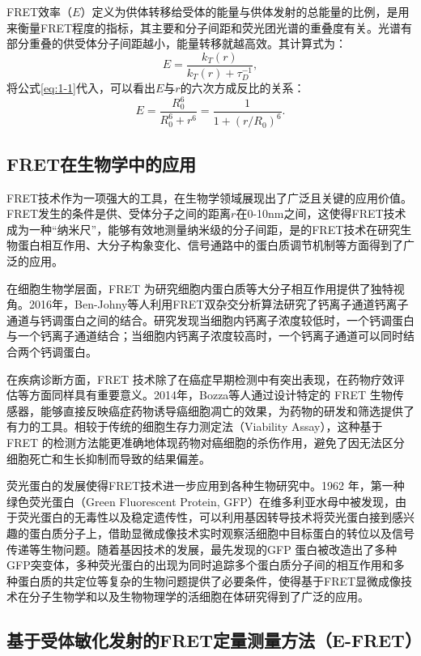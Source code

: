 FRET效率（$E$）定义为供体转移给受体的能量与供体发射的总能量的比例，是用来衡量FRET程度的指标，其主要和分子间距和荧光团光谱的重叠度有关。光谱有部分重叠的供受体分子间距越小，能量转移就越高效。其计算式为：
\begin{equation}
    {E}=\frac{k_T(r)}{k_T(r)+\tau^{-1}_{D}},
\end{equation}
将公式\ref{eq:1-1}代入，可以看出$E$与$r$的六次方成反比的关系：
\begin{equation}
    E=\frac{R_0^6}{R_0^6+r^6}=\frac{1}{1+(r/R_0)^6}.
\end{equation}
\fi


\subsection{FRET在生物学中的应用}

\ifshowtext
FRET技术作为一项强大的工具，在生物学领域展现出了广泛且关键的应用价值。FRET发生的条件是供、受体分子之间的距离$r$在0-10nm之间，这使得FRET技术成为一种“纳米尺”，能够有效地测量纳米级的分子间距，是的FRET技术在研究生物蛋白相互作用、大分子构象变化、信号通路中的蛋白质调节机制等方面得到了广泛的应用。

在细胞生物学层面，FRET 为研究细胞内蛋白质等大分子相互作用提供了独特视角。2016年，Ben-Johny等人利用FRET双杂交分析算法研究了钙离子通道钙离子通道与钙调蛋白之间的结合。研究发现当细胞内钙离子浓度较低时，一个钙调蛋白与一个钙离子通道结合；当细胞内钙离子浓度较高时，一个钙离子通道可以同时结合两个钙调蛋白。

在疾病诊断方面，FRET 技术除了在癌症早期检测中有突出表现，在药物疗效评估等方面同样具有重要意义。2014年，Bozza等人通过设计特定的 FRET 生物传感器，能够直接反映癌症药物诱导癌细胞凋亡的效果，为药物的研发和筛选提供了有力的工具。相较于传统的细胞生存力测定法（Viability Assay），这种基于 FRET 的检测方法能更准确地体现药物对癌细胞的杀伤作用，避免了因无法区分细胞死亡和生长抑制而导致的结果偏差。

荧光蛋白的发展使得FRET技术进一步应用到各种生物研究中。1962 年，第一种绿色荧光蛋白（Green Fluorescent Protein, GFP）在维多利亚水母中被发现，由于荧光蛋白的无毒性以及稳定遗传性，可以利用基因转导技术将荧光蛋白接到感兴趣的蛋白质分子上，借助显微成像技术实时观察活细胞中目标蛋白的转位以及信号传递等生物问题。随着基因技术的发展，最先发现的GFP 蛋白被改造出了多种GFP突变体，多种荧光蛋白的出现为同时追踪多个蛋白质分子间的相互作用和多种蛋白质的共定位等复杂的生物问题提供了必要条件，使得基于FRET显微成像技术在分子生物学和以及生物物理学的活细胞在体研究得到了广泛的应用。
\fi

\subsection{基于受体敏化发射的FRET定量测量方法（E-FRET）}

